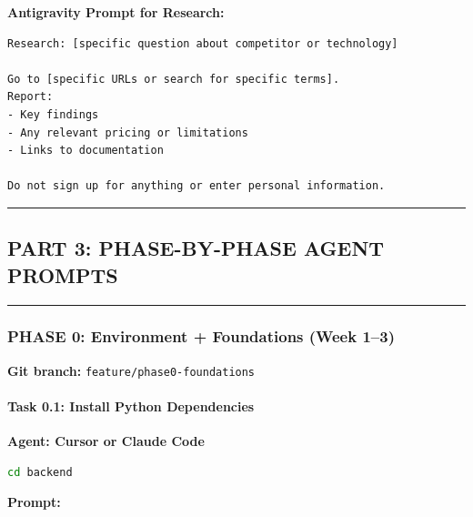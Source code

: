 \documentclass[
  11pt,
]{article}
\newcommand{\passthrough}[1]{#1}
\begin{document}
\textbf{Antigravity Prompt for Research:}

\begin{lstlisting}
Research: [specific question about competitor or technology]

Go to [specific URLs or search for specific terms].
Report:
- Key findings
- Any relevant pricing or limitations
- Links to documentation

Do not sign up for anything or enter personal information.
\end{lstlisting}

\begin{center}\rule{0.5\linewidth}{0.5pt}\end{center}

\hypertarget{part-3-phase-by-phase-agent-prompts}{%
\subsection{PART 3: PHASE-BY-PHASE AGENT
PROMPTS}\label{part-3-phase-by-phase-agent-prompts}}

\begin{center}\rule{0.5\linewidth}{0.5pt}\end{center}

\hypertarget{phase-0-environment-foundations-week-13}{%
\subsubsection{PHASE 0: Environment + Foundations (Week
1--3)}\label{phase-0-environment-foundations-week-13}}

\textbf{Git branch:}
\passthrough{\lstinline!feature/phase0-foundations!}

\hypertarget{task-0.1-install-python-dependencies}{%
\paragraph{Task 0.1: Install Python
Dependencies}\label{task-0.1-install-python-dependencies}}

\textbf{Agent: Cursor or Claude Code}

\begin{lstlisting}[language=bash]
cd backend
\end{lstlisting}

\textbf{Prompt:}
\end{document}
